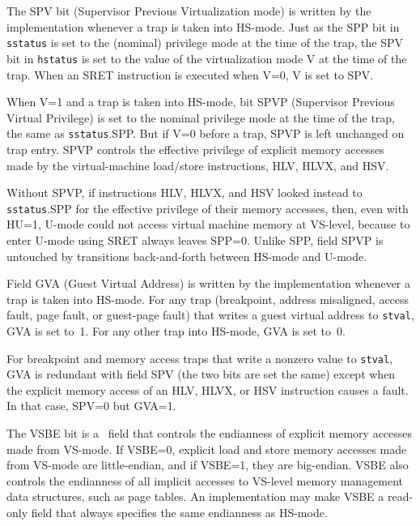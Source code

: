 The SPV bit (Supervisor Previous Virtualization mode) is written by the implementation
whenever a trap is taken into HS-mode.
Just as the SPP bit in {\tt sstatus} is set to the (nominal) privilege
mode at the time of the trap, the SPV bit in {\tt hstatus} is set to the value of the virtualization
mode V at the time of the trap.  When an SRET instruction is executed when V=0,
V is set to SPV.

When V=1 and a trap is taken into HS-mode, bit SPVP (Supervisor Previous
Virtual Privilege) is set to the nominal privilege mode at the time of the trap,
the same as {\tt sstatus}.SPP.
But if V=0 before a trap, SPVP is left unchanged on trap entry.
SPVP controls the effective privilege of explicit memory accesses made by
the virtual-machine load/store instructions, HLV, HLVX, and HSV.

\begin{commentary}
Without SPVP, if instructions HLV, HLVX, and HSV looked instead to
{\tt sstatus}.SPP for the effective privilege of their memory accesses,
then, even with HU=1, U-mode could not access virtual machine memory at
VS-level, because to enter U-mode using SRET always leaves SPP=0.
Unlike SPP, field SPVP is untouched by transitions back-and-forth between
HS-mode and U-mode.
\end{commentary}

Field GVA (Guest Virtual Address) is written by the implementation
whenever a trap is taken into HS-mode.
For any trap (breakpoint, address misaligned,
access fault, page fault, or guest-page fault) that writes
a guest virtual address to {\tt stval}, GVA is set to~1.
For any other trap into HS-mode, GVA is set to~0.

\begin{commentary}
For breakpoint and memory access traps
that write a nonzero value to {\tt stval},
GVA is redundant with field SPV (the two bits are set
the same) except when the explicit memory access of an HLV, HLVX, or HSV
instruction causes a fault.
In that case, SPV=0 but GVA=1.
\end{commentary}

The VSBE bit is a \warl\ field that controls the endianness of explicit
memory accesses made from VS-mode.
If VSBE=0, explicit load and store memory accesses made from VS-mode are
little-endian, and if VSBE=1, they are big-endian.
VSBE also controls the endianness of all implicit accesses to VS-level
memory management data structures, such as page tables.
An implementation may make VSBE a read-only field that always specifies
the same endianness as HS-mode.

